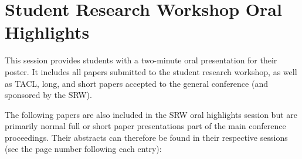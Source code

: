 



\section[SRW Oral Highlights]{Student Research Workshop Oral Highlights}
\label{srw-oral-session}

This session provides students with a two-minute oral presentation for
their poster. It includes all papers submitted to the student research
workshop, as well as TACL, long, and short papers accepted to the general
conference (and sponsored by the SRW).



\vspace{0.5in} The following papers are also included in the SRW oral highlights session but are primarily normal full or short paper presentations part of the main conference proceedings.
Their abstracts can therefore be found in their respective sessions
(see the page number following each entry):


